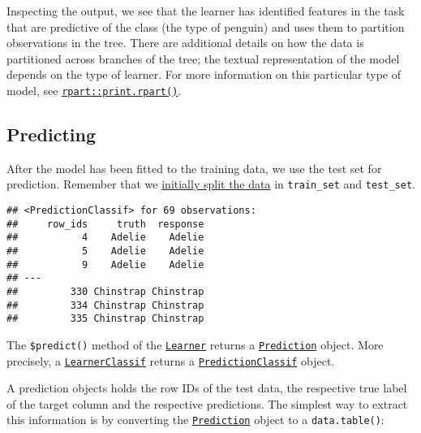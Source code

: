 \documentclass[
]{scrbook}
\newenvironment{Shaded}{\begin{snugshade}}{\end{snugshade}}
\newcommand{\AttributeTok}[1]{\textcolor[rgb]{0.77,0.63,0.00}{#1}}
\newcommand{\FunctionTok}[1]{\textcolor[rgb]{0.00,0.00,0.00}{#1}}
\newcommand{\NormalTok}[1]{#1}
\newcommand{\OtherTok}[1]{\textcolor[rgb]{0.56,0.35,0.01}{#1}}
\newcommand{\SpecialCharTok}[1]{\textcolor[rgb]{0.00,0.00,0.00}{#1}}
\renewenvironment{Shaded} {\begin{snugshade}\small} {\end{snugshade}}
\begin{document}
Inspecting the output, we see that the learner has identified features in the task that are predictive of the class (the type of penguin) and uses them to partition observations in the tree.
There are additional details on how the data is partitioned across branches of the tree; the textual representation of the model depends on the type of learner.
For more information on this particular type of model, see \href{https://www.rdocumentation.org/packages/rpart/topics/print.rpart}{\texttt{rpart::print.rpart()}}.

\hypertarget{predicting}{%
\subsection{Predicting}\label{predicting}}

After the model has been fitted to the training data, we use the test set for prediction.
Remember that we \protect\hyperlink{split-data}{initially split the data} in \texttt{train\_set} and \texttt{test\_set}.

\begin{Shaded}
\end{Shaded}

\begin{verbatim}
## <PredictionClassif> for 69 observations:
##     row_ids     truth  response
##           4    Adelie    Adelie
##           5    Adelie    Adelie
##           9    Adelie    Adelie
## ---                            
##         330 Chinstrap Chinstrap
##         334 Chinstrap Chinstrap
##         335 Chinstrap Chinstrap
\end{verbatim}

The \texttt{\$predict()} method of the \href{https://mlr3.mlr-org.com/reference/Learner.html}{\texttt{Learner}} returns a \href{https://mlr3.mlr-org.com/reference/Prediction.html}{\texttt{Prediction}} object.
More precisely, a \href{https://mlr3.mlr-org.com/reference/LearnerClassif.html}{\texttt{LearnerClassif}} returns a \href{https://mlr3.mlr-org.com/reference/PredictionClassif.html}{\texttt{PredictionClassif}} object.

A prediction objects holds the row IDs of the test data, the respective true label of the target column and the respective predictions.
The simplest way to extract this information is by converting the \href{https://mlr3.mlr-org.com/reference/Prediction.html}{\texttt{Prediction}} object to a \texttt{data.table()}:
\end{document}
